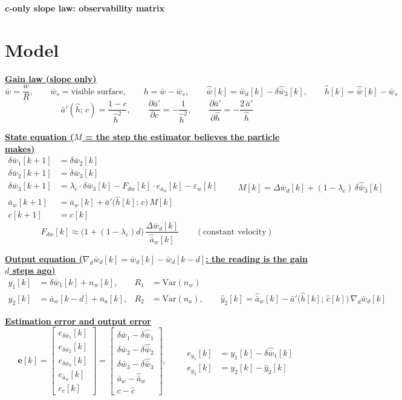 \documentclass[11pt,a4paper]{ctexart}
\newcommand{\lc}{\lambda_c}
\newcommand{\ba}{\bar{a}}
\newcommand{\bw}{\bar{w}}
\newcommand{\dW}{\Delta\bw}
\newcommand{\ap}{\ba'}
\newcommand{\ah}{\hat{\ba}_w}
\newcommand{\wh}{\hat{\bw}}
\newcommand{\hh}{\hat{h}}
\newcommand{\ch}{\hat{c}}
\newcommand{\hd}[1]{\par\bigskip\noindent\underline{\textbf{#1}}}
\begin{document}
\begin{center}\textbf{\large c-only slope law: observability matrix}\end{center}

\section{Model}

\hd{Gain law (slope only)}
\[
\bw = \frac{w}{R}, \qquad \bw_s = \text{visible surface}, \qquad h = \bw - \bw_s, \qquad
\wh[k] = \bw_d[k] - \delta\wh_3[k], \qquad \hh[k] = \wh[k] - \bw_s
\]
\[
\ap(\hh;\,c) = \frac{1 - c}{\hh^{2}}, \qquad
\frac{\partial\ap}{\partial c} = -\frac{1}{\hh^{2}}, \qquad
\frac{\partial\ap}{\partial\hh} = -\frac{2\,\ap}{\hh}
\]

\hd{State equation ($M$ = the step the estimator believes the particle makes)}
\[
\begin{aligned}
\delta\bw_1[k+1] &= \delta\bw_2[k] \\
\delta\bw_2[k+1] &= \delta\bw_3[k] \\
\delta\bw_3[k+1] &= \lc \cdot \delta\bw_3[k] - F_{dw}[k]\cdot e_{\ba_w}[k] - \varepsilon_w[k] \\
\ba_w[k+1] &= \ba_w[k] + \ap\big(\hh[k];\,c\big)\,M[k] \\
c[k+1] &= c[k]
\end{aligned}
\qquad
M[k] = \dW_d[k] + (1-\lc)\,\delta\wh_3[k]
\]
\[
F_{dw}[k] \approx \big(1 + (1-\lc)d\big)\,\dfrac{\dW_d[k]}{\ah[k]} \qquad (\text{constant velocity})
\]

\hd{Output equation ($\nabla_d\bw_d[k] = \bw_d[k] - \bw_d[k-d]$: the reading is the gain $d$ steps ago)}
\[
\begin{aligned}
y_1[k] &= \delta\bw_1[k] + n_w[k], & R_1 &= \mathrm{Var}(n_w) \\
y_2[k] &= \ba_w[k-d] + n_a[k], & R_2 &= \mathrm{Var}(n_a), \qquad
\hat y_2[k] = \ah[k] - \ap\big(\hh[k];\,\ch[k]\big)\,\nabla_d\bw_d[k]
\end{aligned}
\]

\hd{Estimation error and output error}
\[
\mathbf{e}[k] = \begin{bmatrix} e_{\delta\bw_1}[k] \\ e_{\delta\bw_2}[k] \\ e_{\delta\bw_3}[k] \\ e_{\ba_w}[k] \\ e_c[k] \end{bmatrix}
= \begin{bmatrix} \delta\bw_1 - \delta\wh_1 \\ \delta\bw_2 - \delta\wh_2 \\ \delta\bw_3 - \delta\wh_3 \\ \ba_w - \ah \\ c - \ch \end{bmatrix},
\qquad
\begin{aligned}
e_{y_1}[k] &= y_1[k] - \delta\wh_1[k] \\
e_{y_2}[k] &= y_2[k] - \hat y_2[k]
\end{aligned}
\]
\end{document}
